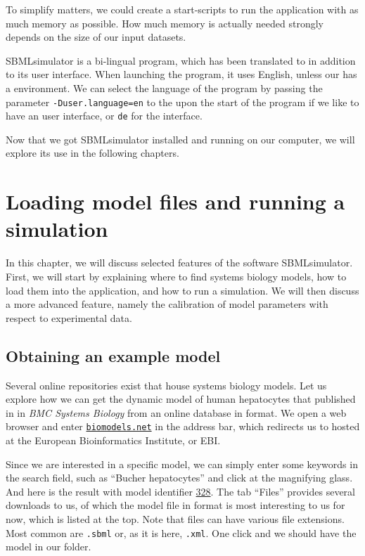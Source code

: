 To simplify matters, we could create a start-scripts to run the application with as much memory as possible.
How much memory is actually needed strongly depends on the size of our input datasets.

SBMLsimulator is a bi-lingual program, which has been translated to \German in addition to its \English user interface.
When launching the program, it uses English, unless our \OS has a \German environment.
We can select the language of the program by passing the parameter \texttt{-Duser.language=en} to the \JVM upon the start of the program if we like to have an \English user interface, or \texttt{de} for the \German interface.

Now that we got SBMLsimulator installed and running on our computer, we will explore its use in the following chapters.


\chapter{Loading model files and running a simulation}%

In this chapter, we will discuss selected features of the software SBMLsimulator.
First, we will start by explaining where to find systems biology models, how to load them into the application, and how to run a simulation.
We will then discuss a more advanced feature, namely the calibration of model parameters with respect to experimental data.

\section{Obtaining an example model}

Several online repositories exist that house systems biology models.
Let us explore how we can get the dynamic model of human hepatocytes that \citeauthor{Bucher2011} published in \citeyear{Bucher2011} in \emph{BMC Systems Biology} from an online database in \SBML format.
We open a web browser and enter \href{http://www.ebi.ac.uk/biomodels/}{\texttt{biomodels.net}} in the address bar, which redirects us to \BioModels \citep{Malik-Sheriff2019} hosted at the European Bioinformatics Institute, or EBI.

Since we are interested in a specific model, we can simply enter some keywords in the search field, such as ``Bucher hepatocytes'' and click at the magnifying glass.
And here is the result with model identifier \numero \href{https://identifiers.org/biomodels.db/BIOMD0000000328}{328}.
The tab ``Files'' provides several downloads to us, of which the model file in \SBML format is most interesting to us for now, which is listed at the top.
Note that \SBML files can have various file extensions.
Most common are \texttt{.sbml} or, as it is here, \texttt{.xml}.
One click and we should have the model in our  folder.

